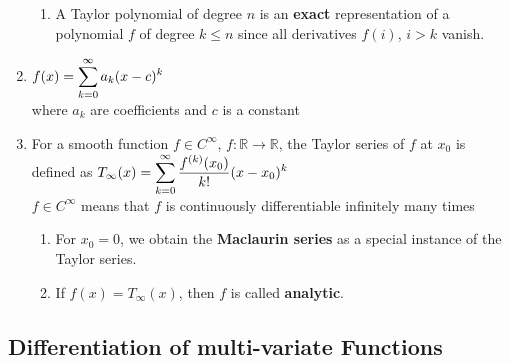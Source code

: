 \begin{enumerate}
\begin{enumerate}
        \item A Taylor polynomial of degree $n$ is an \textbf{exact} representation of a polynomial $f$ of degree $k \leq n$ since all derivatives $f (i)$, $i > k$ vanish. 
        \hfill \cite{mfml/book/mml/Deisenroth-Faisal-Ong}
    \end{enumerate}


    \item 
    \begin{definition}
        $
            f(x) = \displaystyle\sum_{k=0}^{\infty} a_k (x-c)^k
        $
        \\
        where $a_k$ are coefficients and $c$ is a constant
    \end{definition}


    \item 
    \begin{definition}
        For a smooth function $f \in C^{\infty}$, $f : \mathbb{R} \to \mathbb{R}$, the Taylor series of $f$ at $x_0$ is defined as
        $
            T_{\infty}(x)
            = \displaystyle\sum_{k=0}^{\infty} \dfrac{f^{(k)}(x_0)}{k!} (x - x_0)^k
        $
        \hfill \cite{mfml/book/mml/Deisenroth-Faisal-Ong}
        \\
         $f \in C^{\infty}$ means that $f$ is continuously differentiable infinitely many times
         \hfill \cite{mfml/book/mml/Deisenroth-Faisal-Ong}
    \end{definition}
    \begin{enumerate}
        \item 
        \begin{definition}        
            For $x_0 = 0$, we obtain the \textbf{Maclaurin series} as a special instance of the Taylor series. 
            \hfill \cite{mfml/book/mml/Deisenroth-Faisal-Ong}
        \end{definition}

        \item 
        \begin{definition}[Analytic]        
            If $f (x) = T_{\infty}(x)$, then $f$ is called \textbf{analytic}.
            \hfill \cite{mfml/book/mml/Deisenroth-Faisal-Ong}
        \end{definition}
    \end{enumerate}
\end{enumerate}




\subsection{Differentiation of multi-variate Functions}

